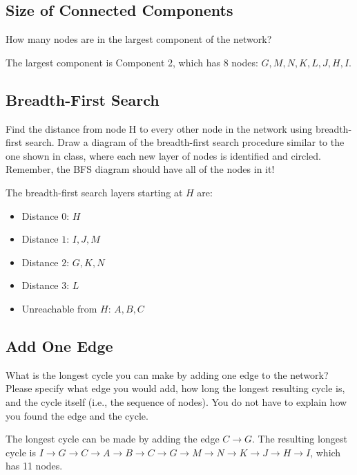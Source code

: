 \documentclass{assignment}
\begin{document}
\subsection{Size of Connected Components}

\begin{problem}
How many nodes are in the largest component of the network?
\end{problem}
The largest component is Component 2, which has 8 nodes: $G, M, N, K, L, J, H, I$.

\subsection{Breadth-First Search}
\begin{problem}
Find the distance from node H to every other node in the network using breadth-first search. Draw a diagram of the breadth-first search procedure similar to the one shown in class, where each new layer of nodes is identified and circled. Remember, the BFS diagram should have all of the nodes in it!
\end{problem}

The breadth-first search layers starting at $H$ are:
\begin{itemize}
    \item Distance $0$: $H$
    \item Distance $1$: $I, J, M$
    \item Distance $2$: $G, K, N$
    \item Distance $3$: $L$
    \item Unreachable from $H$: $A, B, C$
\end{itemize}


\subsection{Add One Edge}
\begin{problem}
What is the longest cycle you can make by adding one edge to the network? Please specify what edge you would add, how long the longest resulting cycle is, and the cycle itself (i.e., the sequence of nodes). You do not have to explain how you found the edge and the cycle.
\end{problem}

The longest cycle can be made by adding the edge $C \to G$. The resulting longest cycle is $I \to G \to C \to A \to B \to C \to G \to M \to N \to K \to J \to H \to I$, which has 11 nodes.
\end{document}
